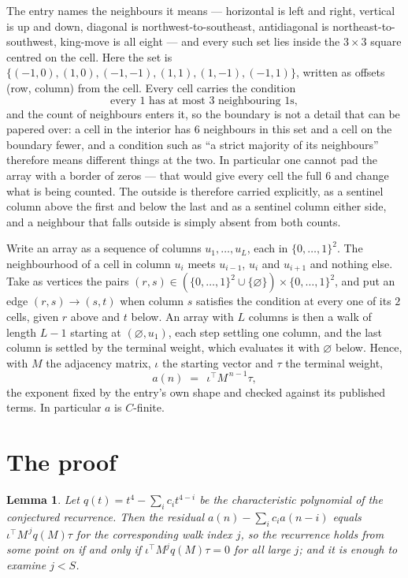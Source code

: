 \documentclass[11pt,a4paper]{article}
\theoremstyle{plain}
\newtheorem{lemma}[theorem]{Lemma}
\theoremstyle{definition}
\begin{document}
The entry names the neighbours it means --- horizontal is left and right, vertical is up and
down, diagonal is northwest-to-southeast, antidiagonal is northeast-to-southwest, king-move is
all eight --- and every such set lies inside the $3\times3$ square centred on the cell. Here
the set is $\{(-1,0), (1,0), (-1,-1), (1,1), (1,-1), (-1,1)\}$, written as offsets (row, column) from the cell. Every cell carries
the condition
\[
\text{every 1 has at most 3 neighbouring 1s},
\]
and the count of neighbours enters it, so the boundary is not a detail that can be papered
over: a cell in the interior has $6$ neighbours in this set and a cell on the boundary
fewer, and a condition such as ``a strict majority of its neighbours'' therefore means
different things at the two. In particular one cannot pad the array with a border of zeros ---
that would give every cell the full $6$ and change what is being counted. The outside is
therefore carried
explicitly, as a sentinel column above the first and below the last and as a sentinel column
either side, and a neighbour that falls outside is simply absent from both counts.

Write an array as a sequence of columns $u_1,\dots,u_L$, each in
$\{0,\dots,1\}^{2}$. The neighbourhood of a cell in column $u_i$ meets $u_{i-1}$,
$u_i$ and $u_{i+1}$ and nothing else. Take as vertices the pairs
$(r,s)\in(\{0,\dots,1\}^{2}\cup\{\varnothing\})\times\{0,\dots,1\}^{2}$,
and put an edge $(r,s)\to(s,t)$ when column $s$ satisfies the condition at every one of its
$2$ cells, given $r$ above and $t$ below. An array with $L$ columns is then a walk of length
$L-1$ starting at $(\varnothing,u_1)$, each step settling one column, and the last column is
settled by the terminal weight, which evaluates it with $\varnothing$ below. Hence,
with $M$ the adjacency matrix, $\iota$ the starting vector and $\tau$ the terminal weight,
\[
a(n)\;=\;\,\iota^{\!\top}M^{\,n-1}\tau ,
\]
the exponent fixed by the entry's own shape and checked against its published terms. In
particular $a$ is $C$-finite.

\section{The proof}

\begin{lemma}\label{lem:crit}
Let $q(t)=t^{4}-\sum_i c_it^{4-i}$ be the characteristic polynomial of the
conjectured recurrence. Then the residual $a(n)-\sum_ic_ia(n-i)$ equals
$\iota^{\!\top}M^{\,j}q(M)\tau$ for the corresponding walk index $j$, so the
recurrence holds from some point on if and only if $\iota^{\!\top}M^{j}q(M)\tau=0$ for all
large $j$; and it is enough to examine $j<S$.
\end{lemma}
\end{document}
